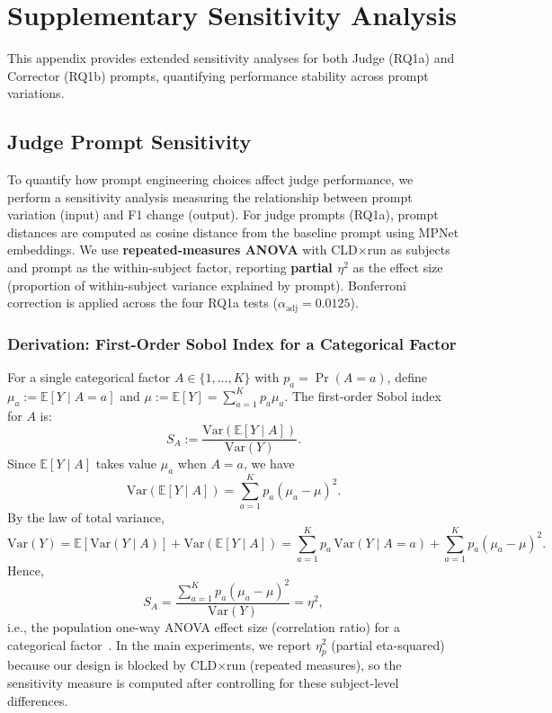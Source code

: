 \section{Supplementary Sensitivity Analysis}
\label{app:sensitivity_analysis}

This appendix provides extended sensitivity analyses for both Judge (RQ1a) and Corrector (RQ1b) prompts, quantifying performance stability across prompt variations.

\subsection{Judge Prompt Sensitivity}
\label{app:judge_sensitivity}

To quantify how prompt engineering choices affect judge performance, we perform a sensitivity analysis measuring the relationship between prompt variation (input) and F1 change (output). For judge prompts (RQ1a), prompt distances are computed as cosine distance from the baseline prompt using MPNet embeddings. We use \textbf{repeated-measures ANOVA} with CLD$\times$run as subjects and prompt as the within-subject factor, reporting \textbf{partial $\eta^2$} as the effect size (proportion of within-subject variance explained by prompt). Bonferroni correction is applied across the four RQ1a tests ($\alpha_{\text{adj}} = 0.0125$).

\subsubsection{Derivation: First-Order Sobol Index for a Categorical Factor}
\label{app:sobol_eta2_derivation}

For a single categorical factor $A \in \{1,\dots,K\}$ with $p_a = \Pr(A=a)$, define $\mu_a := \mathbb{E}[Y \mid A=a]$ and $\mu := \mathbb{E}[Y] = \sum_{a=1}^K p_a \mu_a$. The first-order Sobol index for $A$ is:
\begin{equation}
S_A := \frac{\mathrm{Var}(\mathbb{E}[Y \mid A])}{\mathrm{Var}(Y)}.
\end{equation}
Since $\mathbb{E}[Y \mid A]$ takes value $\mu_a$ when $A=a$, we have
\begin{equation}
\mathrm{Var}(\mathbb{E}[Y \mid A]) = \sum_{a=1}^K p_a(\mu_a - \mu)^2.
\end{equation}
By the law of total variance,
\begin{equation}
\mathrm{Var}(Y) = \mathbb{E}[\mathrm{Var}(Y \mid A)] + \mathrm{Var}(\mathbb{E}[Y \mid A])
= \sum_{a=1}^K p_a\,\mathrm{Var}(Y \mid A=a) + \sum_{a=1}^K p_a(\mu_a - \mu)^2.
\end{equation}
Hence,
\begin{equation}
S_A = \frac{\sum_{a=1}^K p_a(\mu_a - \mu)^2}{\mathrm{Var}(Y)} = \eta^2,
\end{equation}
i.e., the population one-way ANOVA effect size (correlation ratio) for a categorical factor~\cite{saltelli2010variance}. In the main experiments, we report $\eta^2_p$ (partial eta-squared) because our design is blocked by CLD$\times$run (repeated measures), so the sensitivity measure is computed after controlling for these subject-level differences.

